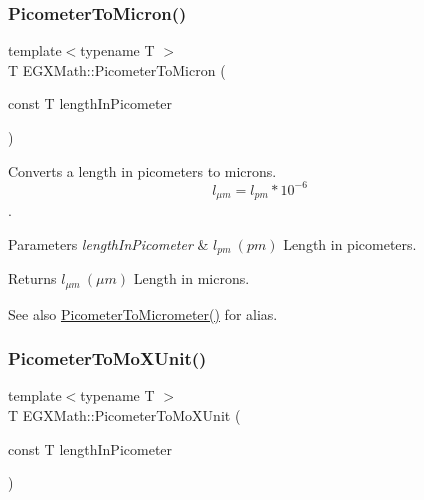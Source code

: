 \subsubsection{\texorpdfstring{Picometer\+To\+Micron()}{PicometerToMicron()}}
{\footnotesize\ttfamily template$<$typename T $>$ \\
T E\+G\+X\+Math\+::\+Picometer\+To\+Micron (\begin{DoxyParamCaption}\item[{const T}]{length\+In\+Picometer }\end{DoxyParamCaption})}



Converts a length in picometers to microns. \[ l_{\mu m}=l_{pm} * 10^{-6} \]. 


\begin{DoxyParams}{Parameters}
{\em length\+In\+Picometer} & $ l_{pm}\ (pm)$ Length in picometers. \\
\hline
\end{DoxyParams}
\begin{DoxyReturn}{Returns}
$ l_{\mu m}\ (\mu m)$ Length in microns. 
\end{DoxyReturn}
\begin{DoxySeeAlso}{See also}
\mbox{\hyperlink{group___e_g_x_math-_conversions-_length_conversions-_s_i-_picometer-_s_i_gacf7ccbf7130894f8a9075cb9fd66c67d}{Picometer\+To\+Micrometer()}} for alias. 
\end{DoxySeeAlso}
\mbox{\label{group___e_g_x_math-_conversions-_length_conversions-_s_i-_picometer-_non-_s_i_ga51b96b4bb30b7e9c971db81ff89a82f8}} 
\subsubsection{\texorpdfstring{Picometer\+To\+Mo\+X\+Unit()}{PicometerToMoXUnit()}}
{\footnotesize\ttfamily template$<$typename T $>$ \\
T E\+G\+X\+Math\+::\+Picometer\+To\+Mo\+X\+Unit (\begin{DoxyParamCaption}\item[{const T}]{length\+In\+Picometer }\end{DoxyParamCaption})}



